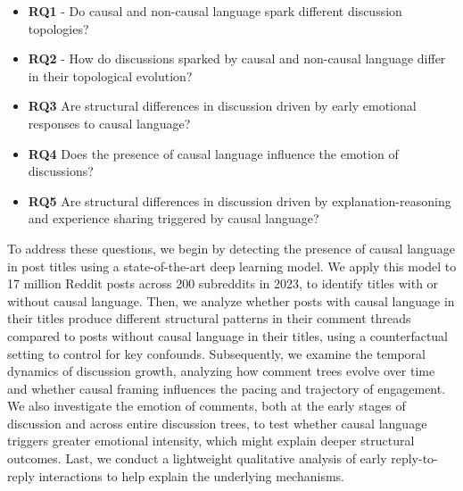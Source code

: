 \documentclass[acmsmall]{acmart}
\begin{document}
\begin{itemize}
    
    \item  \textbf{RQ1} - Do causal and non-causal language spark different discussion topologies?
    
    \item  \textbf{RQ2} - How do discussions sparked by causal and non-causal language differ in their topological evolution?

    \item \textbf{RQ3} Are structural differences in discussion driven by early emotional responses to causal language?

    \item \textbf{RQ4} Does the presence of causal language influence the emotion of discussions?

    \item \textbf{RQ5} Are structural differences in discussion driven by explanation-reasoning and experience sharing triggered by causal language?

\end{itemize}




To address these questions, we begin by detecting the presence of causal language in post titles using a state-of-the-art deep learning model. We apply this model to 17 million Reddit posts across 200 subreddits in 2023, to identify titles with or without causal language. Then, we analyze whether posts with causal language in their titles produce different structural patterns in their comment threads compared to posts without causal language in their titles, using a counterfactual setting to control for key confounds. Subsequently, we examine the temporal dynamics of discussion growth, analyzing how comment trees evolve over time and whether causal framing influences the pacing and trajectory of engagement. We also investigate the emotion of comments, both at the early stages of discussion and across entire discussion trees, to test whether causal language triggers greater emotional intensity, which might explain deeper structural outcomes. Last, we conduct a lightweight qualitative analysis of early reply-to-reply interactions to help explain the underlying mechanisms.
\end{document}

